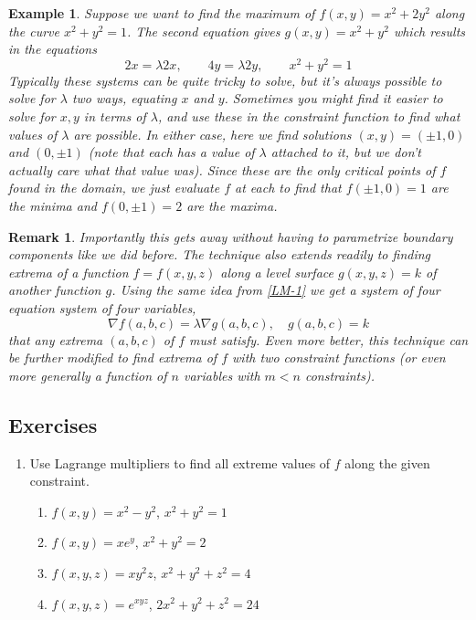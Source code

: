 \documentclass[12pt]{article}
\numberwithin{equation}{subsection}
\numberwithin{figure}{subsection}
\theoremstyle{note}
\newtheorem{example}[subsection]{Example}
\newtheorem{remark}[subsection]{Remark}
\begin{document}
{\begin{example}Suppose we want to find the maximum of $f(x,y)=x^2+2y^2$ along the curve $x^2+y^2=1$. The second equation gives $g(x,y)=x^2+y^2$ which results in the equations\[ 
	2x=\lambda 2x, \qquad
	4y=\lambda 2y, \qquad
	x^2+y^2=1\]
Typically these systems can be quite tricky to solve, but it's always possible to solve for $\lambda$ two ways, equating $x$ and $y$. Sometimes you might find it easier to solve for $x,y$ in terms of $\lambda$, and use these in the constraint function to find what values of $\lambda$ are possible. In either case, here we find solutions $(x,y)=(\pm 1,0)$ and $(0,\pm 1)$ (note that each has a value of $\lambda$ attached to it, but we don't actually care what that value was). Since these are the only critical points of $f$ found in the domain, we just evaluate $f$ at each to find that $f(\pm 1,0)=1$ are the minima and $f(0,\pm 1)=2$ are the maxima. 
\end{example}

\begin{remark}Importantly this gets away without having to parametrize boundary components like we did before. The technique also extends readily to finding extrema of a function $f=f(x,y,z)$ along a level \textit{surface} $g(x,y,z)=k$ of another function $g$. Using the same idea from \eqref{LM-1} we get a system of \textit{four} equation system of four variables, \[\nabla f(a,b,c)=\lambda \nabla g(a,b,c), \quad g(a,b,c)=k\] that any extrema $(a,b,c)$ of $f$ must satisfy. Even more better, this technique can be further modified to find extrema of $f$ with two constraint functions (or even more generally a function of $n$ variables with $m<n$ constraints).\end{remark}

\subsection{Exercises}
\begin{enumerate}[label=\arabic*.]
\item Use Lagrange multipliers to find all extreme values of $f$ along the given constraint.

\begin{enumerate}
	\item $f(x,y)=x^2-y^2$, $x^2+y^2=1$
	\item $f(x,y)=xe^y$, $x^2+y^2=2$
	\item $f(x,y,z)=xy^2z$, $x^2+y^2+z^2=4$
	\item $f(x,y,z)=e^{xyz}$, $2x^2+y^2+z^2=24$
\end{enumerate}


\end{enumerate}}
\end{document}
